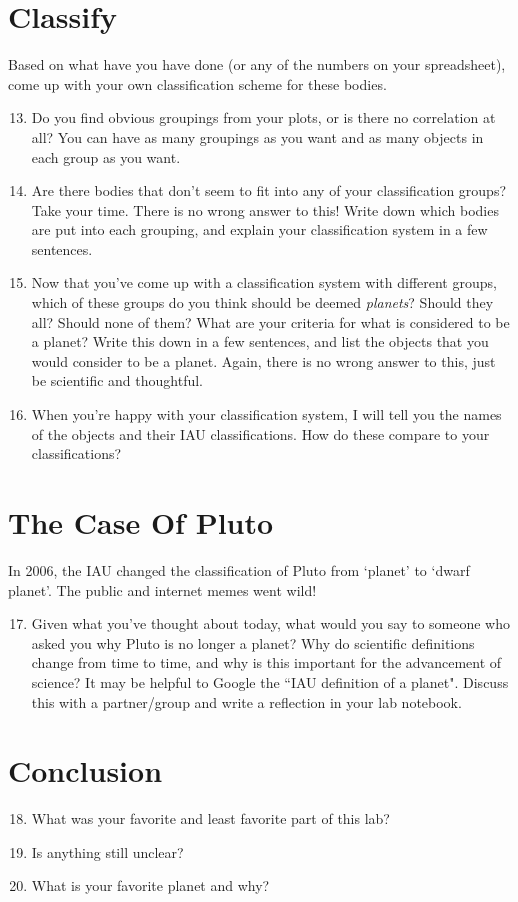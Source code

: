 \documentclass[12pt]{article}
\begin{document}
\section*{Classify}
Based on what have you have done (or any of the numbers on your spreadsheet), come up with your own classification scheme for these bodies.  

\begin{enumerate}
    \setcounter{enumi}{12}
    \item Do you find obvious groupings from your plots, or is there no correlation at all? You can have as many groupings as you want and as many objects in each group as you want.
    \item Are there bodies that don't seem to fit into any of your classification groups? Take your time. There is no wrong answer to this! Write down which bodies are put into each grouping, and explain your classification system in a few sentences.
    \item Now that you've come up with a classification system with different groups, which of these groups do you think should be deemed \emph{planets}? Should they all?  Should none of them?  What are your criteria for what is considered to be a planet? Write this down in a few sentences, and list the objects that you would consider to be a planet. Again, there is no wrong answer to this, just be scientific and thoughtful.
    \item When you're happy with your classification system, I will tell you the names of the objects and their IAU classifications. How do these compare to your classifications? 
\end{enumerate}

\newpage
\section*{The Case Of Pluto}
In 2006, the IAU changed the classification of Pluto from `planet' to `dwarf planet'. The public and internet memes went wild!

\begin{enumerate}
    \setcounter{enumi}{16}
\item Given what you've thought about today, what would you say to someone who asked you why Pluto is no longer a planet? Why do scientific definitions change from time to time, and why is this important for the advancement of science? It may be helpful to Google the ``IAU definition of a planet". Discuss this with a partner/group and write a reflection in your lab notebook.
\end{enumerate}

\section*{Conclusion}

\begin{enumerate}
    \setcounter{enumi}{17}
    \item What was your favorite and least favorite part of this lab?
    \item Is anything still unclear?
    \item What is your favorite planet and why?
\end{enumerate}
\end{document}
